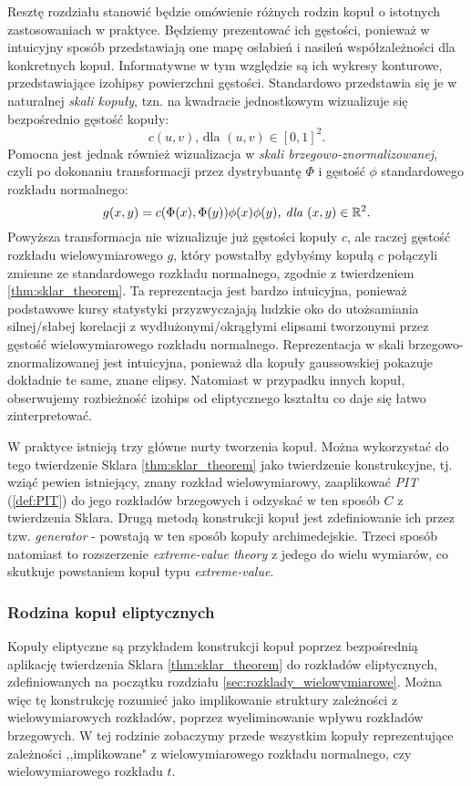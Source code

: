 Resztę rozdziału stanowić będzie omówienie różnych rodzin kopuł o istotnych zastosowaniach w praktyce. Będziemy prezentować ich gęstości, ponieważ w intuicyjny sposób przedstawiają one mapę osłabień i nasileń współzależności dla konkretnych kopuł. Informatywne w tym względzie są ich wykresy konturowe, przedstawiające izohipsy powierzchni gęstości. Standardowo przedstawia się je w naturalnej \emph{skali kopuły}, tzn. na kwadracie jednostkowym wizualizuje się bezpośrednio gęstość kopuły:
$$ c(u, v)\text{, dla } (u, v) \in [0, 1]^2.$$
Pomocna jest jednak również wizualizacja w \emph{skali brzegowo-znormalizowanej}, czyli po dokonaniu transformacji przez dystrybuantę $\Phi$ i gęstość $\phi$ standardowego rozkładu normalnego:
 $$ g(x, y) = c(\Phi(x), \Phi(y))\phi(x)\phi(y)\textit{, dla }(x,y)\in\mathbb{R}^2.$$
Powyższa transformacja nie wizualizuje już gęstości kopuły $c$, ale raczej gęstość rozkładu wielowymiarowego $g$, który powstałby gdybyśmy kopułą $c$ połączyli zmienne ze standardowego rozkładu normalnego, zgodnie z twierdzeniem \ref{thm:sklar_theorem}. Ta reprezentacja jest bardzo intuicyjna, ponieważ podstawowe kursy statystyki przyzwyczajają ludzkie oko do utożsamiania silnej/słabej korelacji z wydłużonymi/okrągłymi elipsami tworzonymi przez gęstość wielowymiarowego rozkładu normalnego. Reprezentacja w skali brzegowo-znormalizowanej jest intuicyjna, ponieważ dla kopuły gaussowskiej pokazuje dokładnie te same, znane elipsy. Natomiast w przypadku innych kopuł, obserwujemy rozbieżność izohips od eliptycznego kształtu co daje się łatwo zinterpretować. 

W praktyce istnieją trzy główne nurty tworzenia kopuł. Można wykorzystać do tego twierdzenie Sklara \ref{thm:sklar_theorem} jako twierdzenie konstrukcyjne, tj. wziąć pewien istniejący, znany rozkład wielowymiarowy, zaaplikować \emph{PIT} (\ref{def:PIT}) do jego rozkładów brzegowych i odzyskać w ten sposób $C$ z twierdzenia Sklara. Drugą metodą konstrukcji kopuł jest zdefiniowanie ich przez tzw. \emph{generator} - powstają w ten sposób kopuły archimedejskie. Trzeci sposób natomiast to rozszerzenie \emph{extreme-value theory} z jedego do wielu wymiarów, co skutkuje powstaniem kopuł typu \emph{extreme-value}.\\

\subsubsection{Rodzina kopuł eliptycznych}

Kopuły eliptyczne są przykładem konstrukcji kopuł poprzez bezpośrednią aplikację twierdzenia Sklara \ref{thm:sklar_theorem} do rozkładów eliptycznych, zdefiniowanych na początku rozdziału \ref{sec:rozklady_wielowymiarowe}. Można więc tę konstrukcję rozumieć jako implikowanie struktury zależności z wielowymiarowych rozkładów, poprzez wyeliminowanie wpływu rozkładów brzegowych. W tej rodzinie zobaczymy przede wszystkim kopuły reprezentujące zależności ,,implikowane" z wielowymiarowego rozkładu normalnego, czy wielowymiarowego rozkładu $t$.

